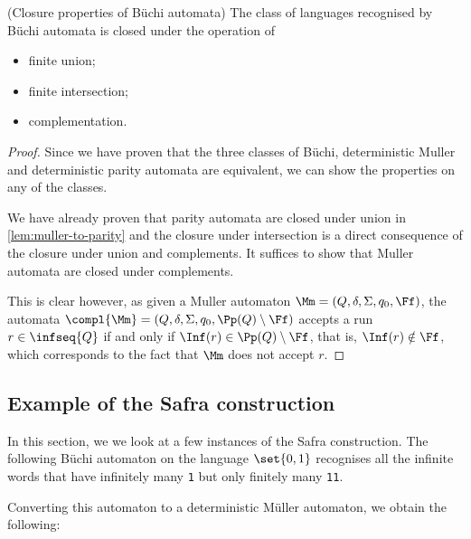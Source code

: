 \begin{theorem}(Closure properties of Büchi automata)
    \label{thm:closure-of-buchi}
    The class of languages recognised by Büchi automata
    is closed under the operation of \begin{itemize}
        \item finite union;
        \item finite intersection;
        \item complementation.
    \end{itemize}
\end{theorem}
\begin{proof}
    Since we have proven that the three classes of Büchi,
    deterministic Muller and deterministic parity automata
    are equivalent, we can show the properties on any of the classes.

    We have already proven that parity automata are closed
    under union in \autoref{lem:muller-to-parity}
    and the closure under intersection
    is a direct consequence of the closure under union and complements.
    It suffices to show that Muller automata are closed under complements.

    This is clear however, as given a Muller automaton $\Mm = (Q, \delta, \Sigma, q_0, \Ff)$,
    the automata $\compl{\Mm} = (Q, \delta, \Sigma, q_0, \Pp(Q) \setminus \Ff)$
    accepts a run $r \in \infseq{Q}$ if and only if $\Inf(r) \in \Pp(Q) \setminus \Ff$, that is,
    $\Inf(r) \notin \Ff$, which corresponds to the fact that $\Mm$ does not accept $r$.
\end{proof}

\subsection{Example of the Safra construction}\label{sec:safra-examples}

In this section, we we look at a few instances of the Safra construction.
The following Büchi automaton on the language $\set{0, 1}$ recognises
all the infinite words that have infinitely many \verb|1|
but only finitely many \verb|11|.

\begin{center}
    
\end{center}

Converting this automaton to a deterministic Müller automaton,
we obtain the following:

\begin{center}
    \scalebox{0.88}{}
\end{center}

